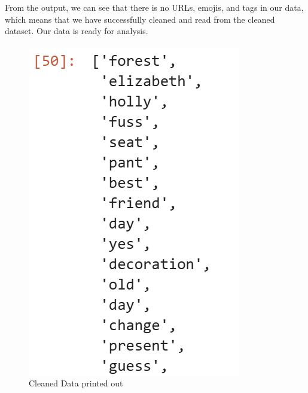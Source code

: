 \documentclass[12pt]{article}
\begin{document}
	From the output, we can see that there is no URLs, emojis, and tags in our data, which means that we have successfully cleaned and read from the cleaned dataset. Our data is ready for analysis.
	\begin{figure}[H]
		\centering
		\includegraphics{Q2VADER1} 
		\caption{Cleaned Data printed out}		
	\end{figure}
	
\end{document}
